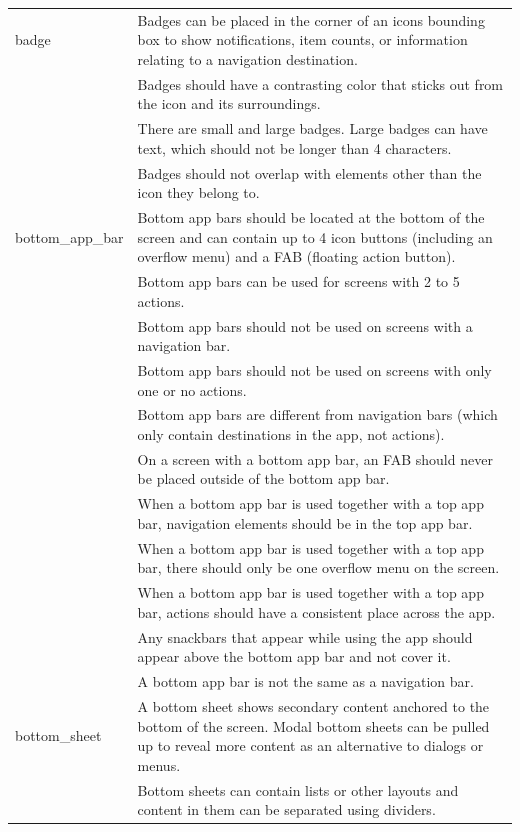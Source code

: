 \documentclass[11pt,titlepage,oneside,openany]{book}
\begin{document}
\begin{longtable}{|p{}|p{}|}
	badge & Badges can be placed in the corner of an icons bounding box to show notifications, item counts, or information relating to a navigation destination. \\ 
	~ & Badges should have a contrasting color that sticks out from the icon and its surroundings. \\ 
	~ & There are small and large badges. Large badges can have text, which should not be longer than 4 characters. \\ 
	~ & Badges should not overlap with elements other than the icon they belong to. \\ \hline
	bottom\_app\_bar & Bottom app bars should be located at the bottom of the screen and can contain up to 4 icon buttons (including an overflow menu) and a FAB (floating action button). \\ 
	~ & Bottom app bars can be used for screens with 2 to 5 actions. \\ 
	~ & Bottom app bars should not be used on screens with a navigation bar. \\ 
	~ & Bottom app bars should not be used on screens with only one or no actions. \\ 
	~ & Bottom app bars are different from navigation bars (which only contain destinations in the app, not actions). \\ 
	~ & On a screen with a bottom app bar, an FAB should never be placed outside of the bottom app bar. \\ 
	~ & When a bottom app bar is used together with a top app bar, navigation elements should be in the top app bar. \\ 
	~ & When a bottom app bar is used together with a top app bar, there should only be one overflow menu on the screen. \\ 
	~ & When a bottom app bar is used together with a top app bar, actions should have a consistent place across the app. \\ 
	~ & Any snackbars that appear while using the app should appear above the bottom app bar and not cover it. \\ 
	~ & A bottom app bar is not the same as a navigation bar. \\ \hline
	bottom\_sheet & A bottom sheet shows secondary content anchored to the bottom of the screen. Modal bottom sheets can be pulled up to reveal more content as an alternative to dialogs or menus. \\ 
	~ & Bottom sheets can contain lists or other layouts and content in them can be separated using dividers. \\ 

\end{longtable}
\end{document}
